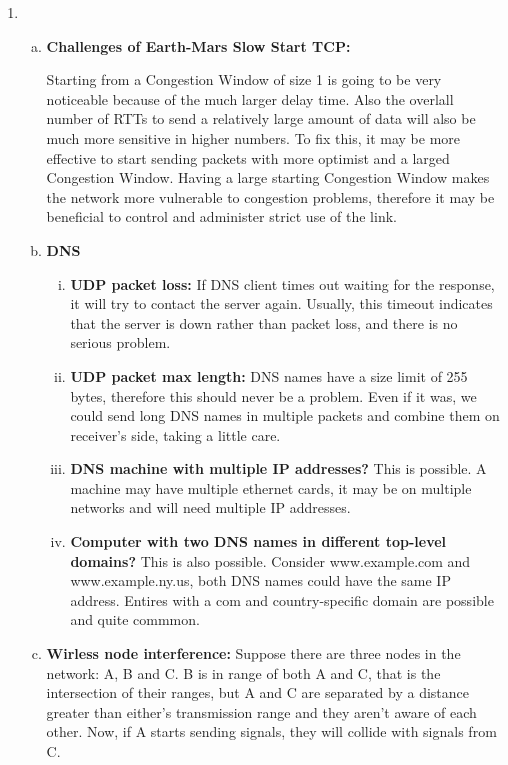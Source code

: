 \documentclass[11pt]{article}
\begin{document}
\begin{enumerate}[1.]
\item %
  \begin{enumerate}[(a)]
  \item \textbf { Challenges of Earth-Mars Slow Start TCP: }

  Starting from a Congestion Window of size 1 is going to be very noticeable because of the much larger delay time. Also the overlall number of RTTs to send a relatively large amount of data will also be much more sensitive in higher numbers. To fix this, it may be more effective to start sending packets with more optimist and a larged Congestion Window. Having a large starting Congestion Window makes the network more vulnerable to congestion problems, therefore it may be beneficial to control and administer strict use of the link.
  \item \textbf { DNS }
    \begin{enumerate}[i.]
    \item \textbf { UDP packet loss:}
    If DNS client times out waiting for the response, it will try to contact the server again. Usually, this timeout indicates that the server is down rather than packet loss, and there is no serious problem.
    \item \textbf { UDP packet max length:}
    DNS names have a size limit of 255 bytes, therefore this should never be a problem. Even if it was, we could send long DNS names in multiple packets and combine them on receiver's side, taking a little care.
    \item \textbf { DNS machine with multiple IP addresses?}
    This is possible. A machine may have multiple ethernet cards, it may be on multiple networks and will need multiple IP addresses.
    \item \textbf { Computer with two DNS names in different top-level domains?}
    This is also possible. Consider www.example.com and www.example.ny.us, both DNS names could have the same IP address. Entires with a com and country-specific domain are possible and quite commmon.
    \end{enumerate} 
  \item \textbf { Wirless node interference: }
  Suppose there are three nodes in the network: A, B and C. B is in range of both A and C, that is the intersection of their ranges, but A and C are separated by a distance greater than either's transmission range and they aren't aware of each other. Now, if A starts sending signals, they will collide with signals from C.


\end{enumerate}
\end{enumerate}
\end{document}
